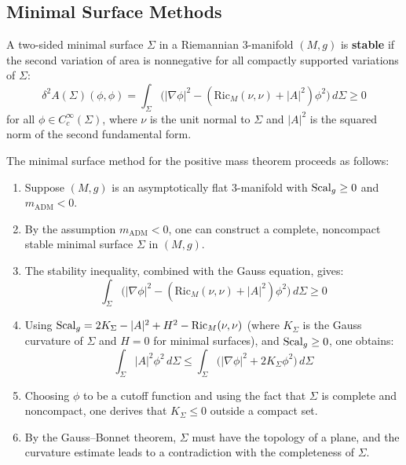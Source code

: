 \subsection{Minimal Surface Methods}

\begin{definition}
A two-sided minimal surface $\Sigma$ in a Riemannian $3$-manifold $(M, g)$ is \textbf{stable} if the second variation of area is nonnegative for all compactly supported variations of $\Sigma$:
\[
\delta^2 A(\Sigma)(\phi, \phi) = \int_\Sigma \bigl(|\nabla \phi|^2 - (\text{Ric}_M(\nu, \nu) + |A|^2) \phi^2\bigr) \, d\Sigma \geq 0
\]
for all $\phi \in C_c^\infty(\Sigma)$, where $\nu$ is the unit normal to $\Sigma$ and $|A|^2$ is the squared norm of the second fundamental form.
\end{definition}

\begin{theorem}
The minimal surface method for the positive mass theorem proceeds as follows:
\begin{enumerate}
    \item Suppose $(M, g)$ is an asymptotically flat $3$-manifold with $\operatorname{Scal}_g \geq 0$ and $m_{\text{ADM}} < 0$.
    \item By the assumption $m_{\text{ADM}} < 0$, one can construct a complete, noncompact stable minimal surface $\Sigma$ in $(M, g)$.
    \item The stability inequality, combined with the Gauss equation, gives:
    \[
    \int_\Sigma \bigl(|\nabla \phi|^2 - (\text{Ric}_M(\nu, \nu) + |A|^2) \phi^2\bigr) \, d\Sigma \geq 0
    \]
    \item Using $\operatorname{Scal}_g = 2K_\Sigma - |A|^2 + H^2 - \text{Ric}_M(\nu,\nu)$ (where $K_\Sigma$ is the Gauss curvature of $\Sigma$ and $H = 0$ for minimal surfaces), and $\operatorname{Scal}_g \geq 0$, one obtains:
    \[
    \int_\Sigma |A|^2 \phi^2 \, d\Sigma \leq \int_\Sigma \bigl(|\nabla \phi|^2 + 2K_\Sigma \phi^2\bigr) \, d\Sigma
    \]
    \item Choosing $\phi$ to be a cutoff function and using the fact that $\Sigma$ is complete and noncompact, one derives that $K_\Sigma \leq 0$ outside a compact set.
    \item By the Gauss--Bonnet theorem, $\Sigma$ must have the topology of a plane, and the curvature estimate leads to a contradiction with the completeness of $\Sigma$.
\end{enumerate}
\end{theorem}

